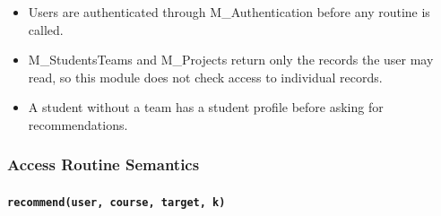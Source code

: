 \documentclass[12pt, titlepage]{article}
\begin{document}
\begin{itemize}
    \item Users are authenticated through M\_Authentication before any routine is called.
    \item M\_StudentsTeams and M\_Projects return only the records the user may read, so this module does not check access to individual records.
    \item A student without a team has a student profile before asking for recommendations.
\end{itemize}

\subsubsection{Access Routine Semantics}

\paragraph{\texttt{recommend(user, course, target, k)}}
\end{document}
